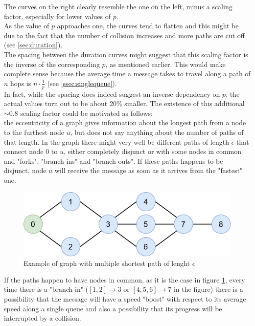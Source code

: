 \hfill \break
The curves on the right clearly resemble the one on the left, minus a scaling
factor, especially for lower values of $p$.\\
As the value of $p$ approaches one, the curves tend to flatten and this might be
due to the fact that the number of collision increases and more paths are cut
off (see \ref{sec:duration}).\\
The spacing between the duration curves might suggest that this scaling factor
is the inverse of the corresponding $p$, as mentioned earlier. This would make
complete sense because the average time a message takes to travel along a path
of $n$ hops is $n \cdot \frac{1}{p}$ (see \ref{ssec:singlequeue}).\\
In fact, while the spacing does indeed suggest an inverse dependency on $p$,
the actual values turn out to be about 20\% smaller. The existence of this
additional $\sim0.8$ scaling factor could be motivated as follows:\\
the eccentricity of a graph gives information about the longest path from a
node to the furthest node $u$, but does not say anything about the number of
paths of that length. In the graph there might very well be different paths of
length $\epsilon$ that connect node 0 to $u$, either completely disjunct or
with some nodes in common and "forks", "branch-ins" and "branch-outs". If these
paths happens to be disjunct, node $u$ will receive the message as soon as it
arrives from the "fastest" one.
\begin{figure}
	\includegraphics[width=1\linewidth]{img/branchIn.png} 
	\caption{Example of graph with multiple shortest path of lenght $\epsilon$}
	\label{fig:branchIn}
\end{figure}
If the paths happen to have nodes in common, as it is the case in figure
\ref{fig:branchIn}, every time there is a "branch-in" ($[1,2]{\to}3$ or
$[4,5,6]{\to}7$ in the figure) there is a possibility that the message will
have a speed "boost" with respect to its average speed along a single queue and
also a possibility that its progress will be interrupted by a collision.
